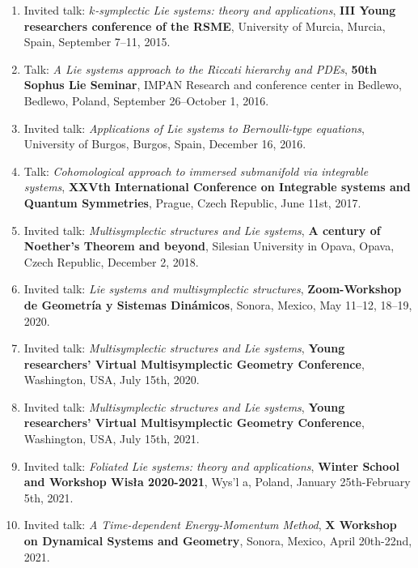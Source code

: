 \documentclass[12pt,reqno]{amsbook}
\begin{document}
\begin{enumerate}
\item Invited talk: {\it $k$-symplectic Lie systems: theory and applications}, {\bf III Young researchers conference of the RSME}, University of Murcia, Murcia, Spain, September 7--11, 2015. 

\item  Talk: {\it A Lie systems approach to the Riccati hierarchy and PDEs}, {\bf 50th Sophus Lie Seminar}, IMPAN Research and conference center in Bedlewo, Bedlewo, Poland, September 26--October 1, 2016.

\item Invited talk: {\it Applications of Lie systems to Bernoulli-type equations}, University of Burgos, Burgos, Spain, December 16, 2016.

\item Talk: {\it Cohomological approach to immersed submanifold via integrable systems}, {\bf XXVth International Conference on Integrable systems and Quantum Symmetries}, Prague, Czech Republic, June 11st, 2017.

\item Invited talk: {\it Multisymplectic structures and Lie systems}, {\bf A century of Noether's Theorem and beyond}, Silesian University in Opava, Opava, Czech Republic, December 2, 2018.

\item Invited talk: {\it Lie systems and multisymplectic structures},  {\bf Zoom-Workshop de Geometr\'ia y Sistemas Din\'amicos}, Sonora, Mexico, May 11--12, 18--19, 2020.

\item Invited talk: {\it Multisymplectic structures and Lie systems},  {\bf Young researchers' Virtual Multisymplectic Geometry Conference}, Washington, USA, July 15th, 2020.

\item Invited talk: {\it Multisymplectic structures and Lie systems},  {\bf Young researchers' Virtual Multisymplectic Geometry Conference}, Washington, USA, July 15th, 2021.

\item Invited talk: {\it Foliated Lie systems: theory and applications},  {\bf Winter School and Workshop Wisła 2020-2021}, Wys'l a, Poland, January 25th-February 5th, 2021.

\item Invited talk: {\it A Time-dependent Energy-Momentum Method},  {\bf X Workshop on Dynamical Systems and Geometry}, Sonora, Mexico, April 20th-22nd, 2021.



\end{enumerate}
\end{document}
